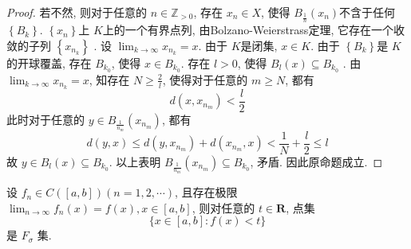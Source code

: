 \documentclass[../main.tex]{subfiles}
\begin{document}
\begin{proof}
    若不然, 则对于任意的 \( n\in \mathbb{Z} _{> 0}\), 存在 \(  x_{n} \in X  \), 使得 \(  B_{ \frac{1 }{n }  }\left( x_{n} \right)   \)不含于任何 \(  \left\{ B_{k} \right\}  \).    \(  \left\{ x_{n} \right\}  \)上 \(  K  \)上的一个有界点列, 由Bolzano-Weierstrass定理, 它存在一个收敛的子列 \(  \left\{ x_{n_{k}} \right\}  \)   . 设 \(  \lim_{k\to \infty}x_{n_{k}}= x  \). 由于 \(  K  \)是闭集, \(  x \in K  \).  由于 \(  \left\{ B_{k} \right\}  \)是 \(  K  \)的开球覆盖, 存在 \(  B_{k_0}  \), 使得 \(  x \in B_{k_0}  \). 存在 \(  l> 0  \), 使得 \(  B_{l}\left( x \right)\subseteq B_{k_0}   \)  . 由 \(  \lim_{k\to \infty}x_{n_{k}}= x  \), 知存在 \(  N\ge \frac{2 }{l }   \), 使得对于任意的 \(  m\ge N  \), 都有 \[
    d\left( x, x_{n_{m}} \right)< \frac{l }{2 }  
    \]        此时对于任意的 \(  y \in B_{\frac{1 }{n_{m} } }\left( x_{n_{m}} \right)   \), 都有 \[
    d\left( y, x \right) \le d\left( y, x_{n_{m}} \right)+ d\left( x_{n_{m}},x \right)  < \frac{1 }{N }+ \frac{l }{2 }\le l  
    \] 故 \(  y \in B_{l}\left( x \right)  \subseteq B_{k_0}  \). 以上表明 \(  B_{\frac{1 }{n_{m} } }\left( x_{n_{m}} \right) \subseteq B_{k_0}  \), 矛盾.  因此原命题成立.  
\end{proof}
\begin{exercise}{}{}
设 $f_n \in C([a,b]) (n=1,2,\cdots)$, 且存在极限 $\lim_{n\to\infty} f_n(x) = f(x), x \in [a,b]$, 则对任意的 $t \in \mathbf{R}$, 点集
\[
\{x \in [a,b]: f(x) < t\}
\]
是 $F_\sigma$ 集.
\end{exercise}
\end{document}

